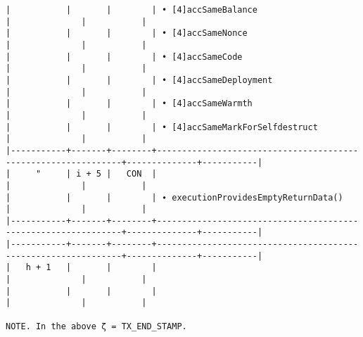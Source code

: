 \documentclass[varwidth=\maxdimen,margin=0.5cm,multi={verbatim}]{standalone}
\begin{document}
\begin{verbatim}
|           |       |        | • [4]accSameBalance                                           |              |           |
|           |       |        | • [4]accSameNonce                                             |              |           |
|           |       |        | • [4]accSameCode                                              |              |           |
|           |       |        | • [4]accSameDeployment                                        |              |           |
|           |       |        | • [4]accSameWarmth                                            |              |           |
|           |       |        | • [4]accSameMarkForSelfdestruct                               |              |           |
|-----------+-------+--------+---------------------------------------------------------------+--------------+-----------|
|     "     | i + 5 |   CON  |                                                               |              |           |
|           |       |        | ∙ executionProvidesEmptyReturnData()                          |              |           |
|-----------+-------+--------+---------------------------------------------------------------+--------------+-----------|
|-----------+-------+--------+---------------------------------------------------------------+--------------+-----------|
|   h + 1   |       |        |                                                               |              |           |
|           |       |        |                                                               |              |           |

NOTE. In the above ζ = TX_END_STAMP.
\end{verbatim}
\end{document}
